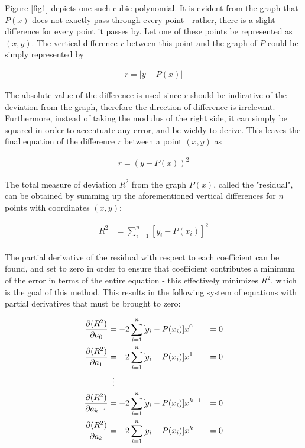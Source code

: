 \documentclass[12pt, a4paper]{article}
\begin{document}
Figure \ref{fig1} depicts one such cubic polynomial. It is evident from the
graph that $P(x)$ does not exactly pass through every point - rather, there is a
slight difference for every point it passes by. Let one of these points be
represented as $(x, y)$. The vertical difference $r$ between this point and the
graph of $P$ could be simply represented by

\begin{align*}
    r=|y-P(x)|
\end{align*}

The absolute value of the difference is used since $r$ should be indicative of
the deviation from the graph, therefore the direction of difference is
irrelevant. Furthermore, instead  of taking the modulus of the right side, it
can simply be squared in order to accentuate any error, and be wieldy to derive.
This leaves the final equation of the difference $r$ between a point $(x, y)$ as

\begin{align*}
    r=(y-P(x))^2
\end{align*}

The total measure of deviation $R^2$ from the graph $P(x)$, called the
"residual", can be obtained by summing up the aforementioned vertical
differences for $n$ points with coordinates $(x, y)$:

\begin{align*}
    R^2 & = \sum^n_{i=1}[y_i-P(x_i)]^2 \\
\end{align*}

The partial derivative of the residual with respect to each coefficient can be
found, and set to zero in order to ensure that coefficient contributes a minimum
of the error in terms of the entire equation - this effectively minimizes $R^2$,
which is the goal of this method. This results in the following system of
equations with partial derivatives that must be brought to zero:

\begin{align*}
    \pdv{(R^2)}{a_0}     & = -2 \sum^n_{i=1}[y_i-P(x_i)] x^0     & = 0 \\
    \pdv{(R^2)}{a_1}     & = -2 \sum^n_{i=1}[y_i-P(x_i)] x^1     & = 0 \\
                         & \vdotswithin{=}                             \\
    \pdv{(R^2)}{a_{k-1}} & = -2 \sum^n_{i=1}[y_i-P(x_i)] x^{k-1} & = 0 \\
    \pdv{(R^2)}{a_k}     & = -2 \sum^n_{i=1}[y_i-P(x_i)] x^k     & = 0
\end{align*}
\end{document}
